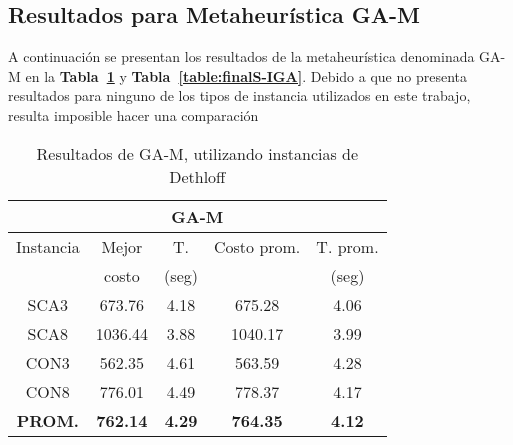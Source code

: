 \subsection{Resultados para Metaheurística GA-M}


A continuación se presentan los resultados de la metaheurística denominada GA-M en la \textbf{Tabla~\ref{table:finalD-IGA}} y \textbf{Tabla~\ref{table:finalS-IGA}}. Debido a que \cite{IGAimp} no presenta resultados para ninguno de los tipos de instancia utilizados en este trabajo, resulta imposible hacer una comparación



\begin{minipage}[h]{0.45\linewidth}
\begin{table}[H]
\caption{ Resultados de GA-M, utilizando instancias de Dethloff}
\centering
\scriptsize 
\begin{tabular}{|c||c c c c|}
\hline
 \multicolumn{5}{|c|}{\bf{GA-M}}\\\hline
Instancia & Mejor & T. & Costo prom. & T. prom.\\
& costo & (seg) & & (seg)\\ [0.5ex]
\hline\hline
SCA3 & 673.76 & 4.18 & 675.28 & 4.06\\
SCA8 & 1036.44 & 3.88 & 1040.17 & 3.99\\
CON3 & 562.35 & 4.61 & 563.59 & 4.28\\
CON8 & 776.01 & 4.49 & 778.37 & 4.17\\\hline\hline\bf{PROM.} & 
\bf{762.14} & \bf{4.29} & \bf{764.35} & \bf{4.12}\\[1ex]\hline
\end{tabular}
\label{table:finalD-IGA}
\end{table}

\end{minipage}
